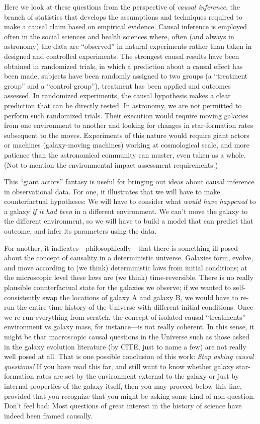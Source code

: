 \documentclass[12pt, letterpaper, preprint]{aastex}
\begin{document}
Here we look at these questions from the perspective of \emph{causal
  inference}, the branch of statistics that develops the assumptions
and techniques required to make a causal claim based on empirical
evidence.
Causal inference is employed often in the social sciences and health
sciences where, often (and always in astronomy) the data are
``observed'' in natural experiments rather than taken in designed and
controlled experiments.
The strongest causal results have been obtained in randomized trials,
in which a prediction about a causal effect has been made, subjects
have been randomly assigned to two groups (a ``treatment group'' and a
``control group''), treatment has been applied and outcomes assessed.
In randomized experiments, the causal hypothesis makes a clear prediction
that can be directly tested.
In astronomy, we are not permitted to perform such randomized trials.
Their execution would require moving galaxies from one environment to
another and looking for changes in star-formation rates subsequent to
the moves.
Experiments of this nature would require giant actors or machines
(galaxy-moving machines) working at cosmological scale, and more
patience than the astronomical community can muster, even taken as a
whole.
(Not to mention the environmental impact assessment requirements.)

This ``giant actors'' fantasy is useful for bringing out ideas about
causal inference in observational data.
For one, it illustrates that we will have to make counterfactual
hypotheses:
We will have to consider what \emph{would have happened} to a galaxy
\emph{if it had been} in a different environment.
We can't move the galaxy to the different environment, so we will have
to build a model that can predict that outcome, and infer its
parameters using the data.

For another, it indicates---philosophically---that there is something
ill-posed about the concept of causality in a deterministic universe.
Galaxies form, evolve, and move according to (we think) deterministic
laws from initial conditions; at the microscopic level these laws are
(we think) time-reversible.
There is no really plausible counterfactual state for the galaxies we
observe; if we wanted to self-consistently swap the locations of
galaxy A and galaxy B, we would have to re-run the entire time history
of the Universe with different initial conditions.
Once we re-run everything from scratch, the concept of isolated causal
``treatments''---environment vs galaxy mass, for instance---is not
really coherent.
In this sense, it might be that macroscopic causal questions in the
Universe such as those asked in the galaxy evolution literature (by
CITE, just to name a few) are not really well posed at all.
That is one possible conclusion of this work:
\emph{Stop asking causal questions!}
If you have read this far, and still want to know whether galaxy
star-formation rates are set by the environment external to the galaxy
or just by internal properties of the galaxy itself, then you may
proceed below this line, provided that you recognize that you might be
asking some kind of non-question.
Don't feel bad:
Most questions of great interest in the history of science have indeed
been framed causally.
\end{document}
